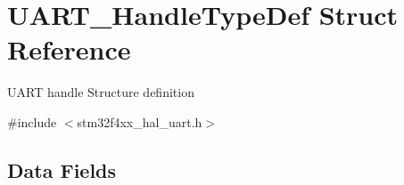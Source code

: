 \hypertarget{struct_u_a_r_t___handle_type_def}{}\section{U\+A\+R\+T\+\_\+\+Handle\+Type\+Def Struct Reference}
\label{struct_u_a_r_t___handle_type_def}


U\+A\+RT handle Structure definition ~\newline
  




{\ttfamily \#include $<$stm32f4xx\+\_\+hal\+\_\+uart.\+h$>$}

\subsection*{Data Fields}
